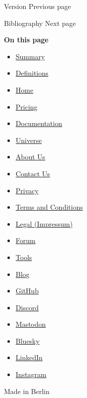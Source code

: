 \href{/docs/reference/foundations/version/}{\pandocbounded{}}

{ Version } { Previous page }

\href{/docs/reference/model/bibliography/}{\pandocbounded{}}

{ Bibliography } { Next page }

\textbf{On this page}

\begin{itemize}
\tightlist
\item
  \hyperref[summary]{Summary}
\item
  \hyperref[definitions]{Definitions}
\end{itemize}

\begin{itemize}
\tightlist
\item
  \href{/}{Home}
\item
  \href{/pricing/}{Pricing}
\item
  \href{/docs/}{Documentation}
\item
  \href{/universe/}{Universe}
\item
  \href{/about/}{About Us}
\item
  \href{/contact/}{Contact Us}
\item
  \href{/privacy/}{Privacy}
\item
  \href{https://typst.app/terms}{Terms and Conditions}
\item
  \href{/legal/}{Legal (Impressum)}
\end{itemize}

\begin{itemize}
\tightlist
\item
  \href{https://forum.typst.app}{Forum}
\item
  \href{/tools/}{Tools}
\item
  \href{/blog/}{Blog}
\item
  \href{https://github.com/typst/}{GitHub}
\item
  \href{https://discord.gg/2uDybryKPe}{Discord}
\item
  \href{https://mastodon.social/@typst}{Mastodon}
\item
  \href{https://bsky.app/profile/typst.app}{Bluesky}
\item
  \href{https://www.linkedin.com/company/typst/}{LinkedIn}
\item
  \href{https://instagram.com/typstapp/}{Instagram}
\end{itemize}

Made in Berlin
